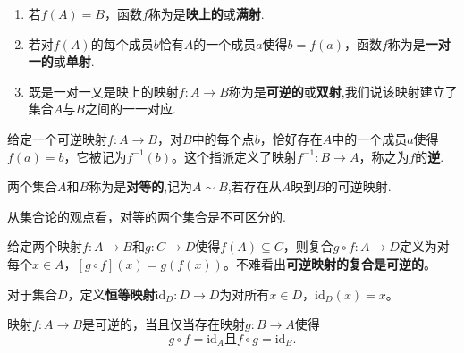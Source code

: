 \documentclass[lang=cn,newtx,10pt,scheme=chinese]{elegantbook}
\begin{document}
\begin{definition}[满射、单射和双射]\label{definition:满射、单射和双射}
\begin{enumerate}
  \item 若\(f(A)=B\)，函数\(f\)称为是\textbf{映上的}或\textbf{满射}.

  \item 若对\(f(A)\)的每个成员\(b\)恰有\(A\)的一个成员\(a\)使得\(b = f(a)\)，函数\(f\)称为是\textbf{一对一的}或\textbf{单射}.

  \item 既是一对一又是映上的映射\(f:A\to B\)称为是\textbf{可逆的}或\textbf{双射},我们说该映射建立了集合\(A\)与\(B\)之间的一一对应.
\end{enumerate}
\end{definition}  

\begin{definition}[可逆映射的逆]\label{definition:可逆映射的逆}
  给定一个可逆映射\(f:A\to B\)，对\(B\)中的每个点\(b\)，恰好存在\(A\)中的一个成员\(a\)使得\(f(a)=b\)，它被记为\(f^{-1}(b)\)。这个指派定义了映射\(f^{-1}:B\to A\)，称之为\(f\)的\textbf{逆}.
\end{definition}

\begin{definition}[对等的集合]\label{definition:对等的集合}
  两个集合\(A\)和\(B\)称为是\textbf{对等的},记为$A\sim B$,若存在从\(A\)映到\(B\)的可逆映射.
\end{definition}
\begin{remark}
  从集合论的观点看，对等的两个集合是不可区分的.
\end{remark}

\begin{proposition}[可逆映射的复合是可逆的]\label{proposition:可逆映射的复合是可逆的}
  给定两个映射\(f:A\to B\)和\(g:C\to D\)使得\(f(A)\subseteq C\)，则复合\(g\circ f:A\to D\)定义为对每个\(x\in A\)，\([g\circ f](x)=g(f(x))\)。不难看出\textbf{可逆映射的复合是可逆的}。
\end{proposition}

\begin{definition}[恒等映射]\label{definition:恒等映射}
  对于集合\(D\)，定义\textbf{恒等映射}\(\text{id}_D:D\to D\)为对所有\(x\in D\)，\(\text{id}_D(x)=x\)。
\end{definition}

\begin{proposition}[可逆映射的充要条件]\label{proposition:可逆映射的充要条件1}
映射\(f:A\to B\)是可逆的，当且仅当存在映射\(g:B\to A\)使得
\[
g\circ f = \text{id}_A且f\circ g = \text{id}_B.
\]
\end{proposition}
\end{document}
